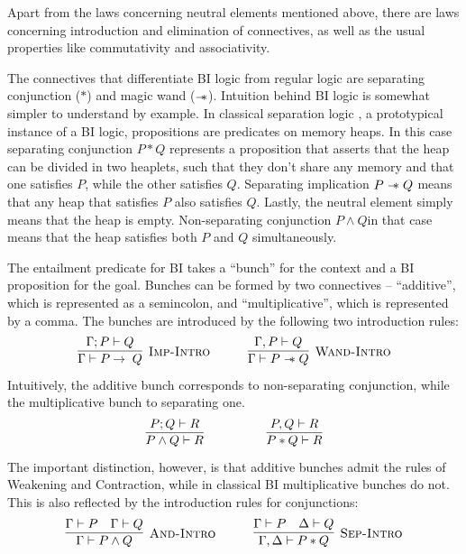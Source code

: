 Apart from the laws concerning neutral elements mentioned above, there are laws concerning introduction and elimination of connectives, as well as the usual properties like commutativity and associativity.

The connectives that differentiate BI logic from regular logic are separating conjunction (\(*\)) and magic wand (\(\mathrel{-\mkern-6mu*}\)).
Intuition behind BI logic is somewhat simpler to understand by example.
In classical separation logic \cite{reynoldsSeparationLogicLogic2002, ohearnLocalReasoningPrograms2001}, a prototypical instance of a BI logic, propositions are predicates on memory heaps.
In this case separating conjunction \(P \ast Q\) represents a proposition that asserts that the heap can be divided in two heaplets, such that they don't share any memory and that one satisfies \(P\), while the other satisfies \(Q\).
Separating implication \(P \mathrel{-\mkern-6mu*} Q\) means that any heap that satisfies \(P\) also satisfies \(Q\).
Lastly, the neutral element \emp simply means that the heap is empty.
Non-separating conjunction \(P \wedge Q \)in that case means that the heap satisfies both \(P\) and \(Q\) simultaneously.

The entailment predicate for BI takes a ``bunch'' for the context and a BI proposition for the goal.
Bunches can be formed by two connectives -- ``additive'', which is represented as a semincolon, and ``multiplicative'', which is represented by a comma.
The bunches are introduced by the following two introduction rules:
\begin{equation*}
  \infer[\textsc{Imp-Intro}]
        {\Gamma \vdash P \imp Q}
        {\Gamma ; P \vdash Q}
  \quad \quad \quad
  \infer[\textsc{Wand-Intro}]
        {\Gamma \vdash P \wand Q}
        {\Gamma , P \vdash Q}
\end{equation*}
Intuitively, the additive bunch corresponds to non-separating conjunction, while the multiplicative bunch to separating one.
\begin{equation*}
  \infer{P \wedge Q \vdash R}
        {P ; Q \vdash R}
  \quad \quad \quad \quad \quad
  \infer{P \ast Q \vdash R}
        {P, Q \vdash R}
\end{equation*}
The important distinction, however, is that additive bunches admit the rules of Weakening and Contraction, while in classical BI multiplicative bunches do not.
This is also reflected by the introduction rules for conjunctions:
\begin{equation*}
  \infer[\textsc{And-Intro}]
        {\Gamma \vdash P \wedge Q}
        {\Gamma \vdash P &
         \Gamma \vdash Q }
  \quad \quad \quad
  \infer[\textsc{Sep-Intro}]
        {\Gamma, \Delta \vdash P \ast Q}
        {\Gamma \vdash P &
         \Delta \vdash Q }
\end{equation*}

